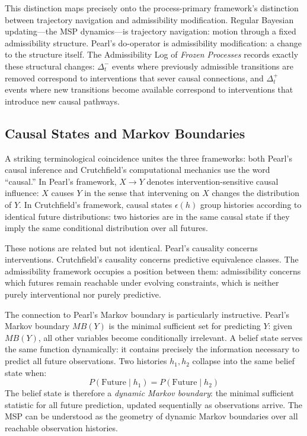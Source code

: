 \documentclass[12pt, a4paper]{article}
\theoremstyle{plain}
\theoremstyle{definition}
\theoremstyle{remark}
\begin{document}
This distinction maps precisely onto the process-primary framework's
distinction between trajectory navigation and admissibility modification.
Regular Bayesian updating---the MSP dynamics---is trajectory navigation:
motion through a fixed admissibility structure. Pearl's do-operator is
admissibility modification: a change to the structure itself. The
Admissibility Log of \emph{Frozen Processes} records exactly these
structural changes: $\Delta_t^-$ events where previously admissible
transitions are removed correspond to interventions that sever causal
connections, and $\Delta_t^+$ events where new transitions become
available correspond to interventions that introduce new causal pathways.

\subsection{Causal States and Markov Boundaries}

A striking terminological coincidence unites the three frameworks: both
Pearl's causal inference and Crutchfield's computational mechanics use the
word ``causal.'' In Pearl's framework, $X \to Y$ denotes
intervention-sensitive causal influence: $X$ causes $Y$ in the sense that
intervening on $X$ changes the distribution of $Y$. In Crutchfield's
framework, causal states $\epsilon(h)$ group histories according to identical
future distributions: two histories are in the same causal state if they
imply the same conditional distribution over all futures.

These notions are related but not identical. Pearl's causality concerns
interventions. Crutchfield's causality concerns predictive equivalence
classes. The admissibility framework occupies a position between them:
admissibility concerns which futures remain reachable under evolving
constraints, which is neither purely interventional nor purely predictive.

The connection to Pearl's Markov boundary is particularly instructive.
Pearl's Markov boundary $MB(Y)$ is the minimal sufficient set for predicting
$Y$: given $MB(Y)$, all other variables become conditionally irrelevant.
A belief state serves the same function dynamically: it contains precisely
the information necessary to predict all future observations. Two histories
$h_1, h_2$ collapse into the same belief state when:
$$P(\text{Future} \mid h_1) = P(\text{Future} \mid h_2)$$
The belief state is therefore a \emph{dynamic Markov boundary}: the minimal
sufficient statistic for all future prediction, updated sequentially as
observations arrive. The MSP can be understood as the geometry of dynamic
Markov boundaries over all reachable observation histories.
\end{document}
